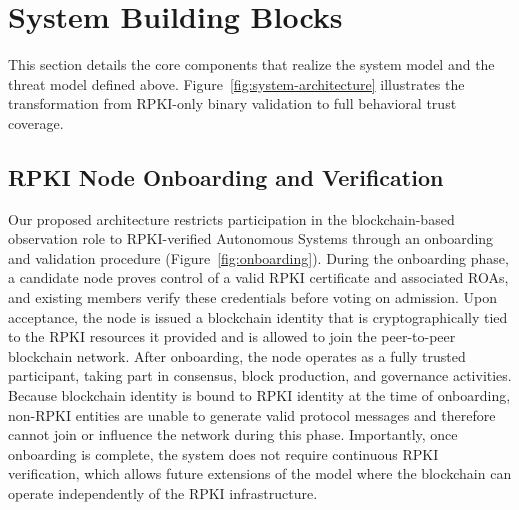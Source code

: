 




\section{System Building Blocks}
\label{sec:architecture}

This section details the core components that realize the system model and the threat model defined above. Figure~\ref{fig:system-architecture} illustrates the transformation from RPKI-only binary validation to full behavioral trust coverage.

\subsection{RPKI Node Onboarding and Verification}

Our proposed architecture restricts participation in the blockchain-based observation role to RPKI-verified Autonomous Systems through an onboarding and validation procedure (Figure~\ref{fig:onboarding}). During the onboarding phase, a candidate node proves control of a valid RPKI certificate and associated ROAs, and existing members verify these credentials before voting on admission. Upon acceptance, the node is issued a blockchain identity that is cryptographically tied to the RPKI resources it provided and is allowed to join the peer-to-peer blockchain network. After onboarding, the node operates as a fully trusted participant, taking part in consensus, block production, and governance activities. Because blockchain identity is bound to RPKI identity at the time of onboarding, non-RPKI entities are unable to generate valid protocol messages and therefore cannot join or influence the network during this phase. Importantly, once onboarding is complete, the system does not require continuous RPKI verification, which allows future extensions of the model where the blockchain can operate independently of the RPKI infrastructure.


